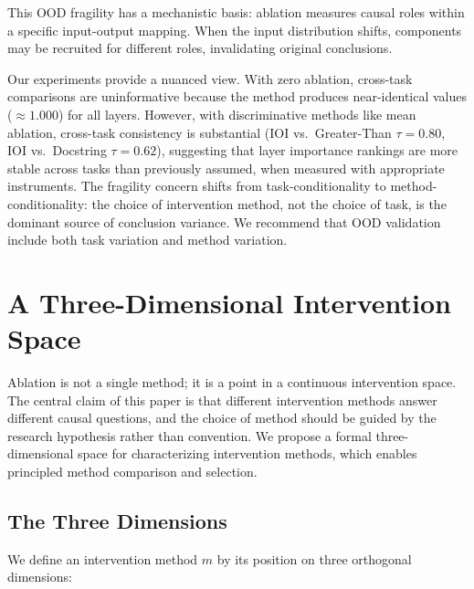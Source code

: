 \documentclass[pdflatex,sn-mathphys-num]{sn-jnl}
\begin{document}
This OOD fragility has a mechanistic basis: ablation measures causal roles within a specific input-output mapping. When the input distribution shifts, components may be recruited for different roles, invalidating original conclusions.

Our experiments provide a nuanced view. With zero ablation, cross-task comparisons are uninformative because the method produces near-identical values ($\approx 1.000$) for all layers. However, with discriminative methods like mean ablation, cross-task consistency is substantial (IOI vs.\ Greater-Than $\tau = 0.80$, IOI vs.\ Docstring $\tau = 0.62$), suggesting that layer importance rankings are more stable across tasks than previously assumed, when measured with appropriate instruments. The fragility concern shifts from task-conditionality to method-conditionality: the choice of intervention method, not the choice of task, is the dominant source of conclusion variance. We recommend that OOD validation include both task variation and method variation.



\section{A Three-Dimensional Intervention Space}
\label{sec:space}

Ablation is not a single method; it is a point in a continuous intervention space. The central claim of this paper is that different intervention methods answer different causal questions, and the choice of method should be guided by the research hypothesis rather than convention. We propose a formal three-dimensional space for characterizing intervention methods, which enables principled method comparison and selection.

\subsection{The Three Dimensions}
\label{sec:dimensions}

We define an intervention method $m$ by its position on three orthogonal dimensions:
\end{document}
